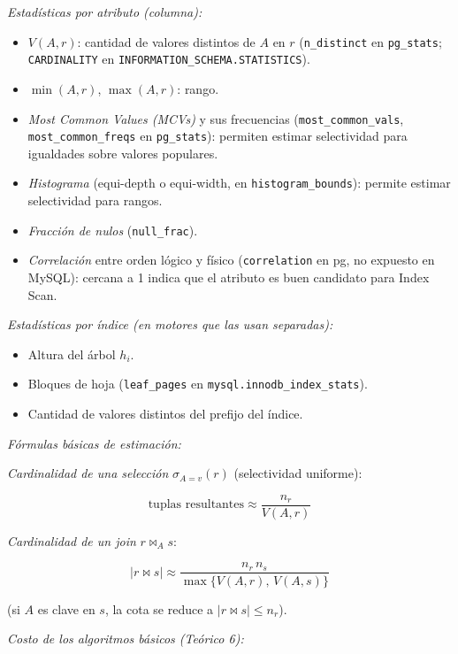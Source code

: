 \documentclass[11pt,a4paper]{article}
\begin{document}
\textit{Estadísticas por atributo (columna):}

\begin{itemize}
    \item $V(A, r)$: cantidad de valores distintos de $A$ en $r$ (\texttt{n\_distinct} en \texttt{pg\_stats}; \texttt{CARDINALITY} en \texttt{INFORMATION\_SCHEMA.STATISTICS}).
    \item $\min(A, r)$, $\max(A, r)$: rango.
    \item \emph{Most Common Values (MCVs)} y sus frecuencias (\texttt{most\_common\_vals}, \texttt{most\_common\_freqs} en \texttt{pg\_stats}): permiten estimar selectividad para igualdades sobre valores populares.
    \item \emph{Histograma} (equi-depth o equi-width, en \texttt{histogram\_bounds}): permite estimar selectividad para rangos.
    \item \emph{Fracción de nulos} (\texttt{null\_frac}).
    \item \emph{Correlación} entre orden lógico y físico (\texttt{correlation} en pg, no expuesto en MySQL): cercana a 1 indica que el atributo es buen candidato para Index Scan.
\end{itemize}

\textit{Estadísticas por índice (en motores que las usan separadas):}

\begin{itemize}
    \item Altura del árbol $h_i$.
    \item Bloques de hoja (\texttt{leaf\_pages} en \texttt{mysql.innodb\_index\_stats}).
    \item Cantidad de valores distintos del prefijo del índice.
\end{itemize}

\textit{Fórmulas básicas de estimación:}

\textit{Cardinalidad de una selección} $\sigma_{A=v}(r)$ (selectividad uniforme):

\[
\text{tuplas resultantes} \approx \frac{n_r}{V(A,r)}
\]

\textit{Cardinalidad de un join} $r \bowtie_A s$:

\[
|r \bowtie s| \approx \frac{n_r \, n_s}{\max\{V(A,r),\,V(A,s)\}}
\]

(si $A$ es clave en $s$, la cota se reduce a $|r \bowtie s| \le n_r$).

\textit{Costo de los algoritmos básicos (Teórico 6):}
\end{document}
